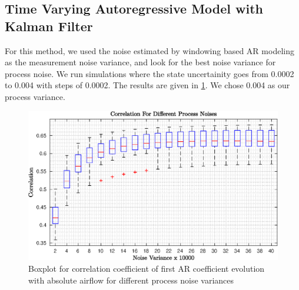 \subsection{Time Varying Autoregressive Model with Kalman Filter}
For this method, we used the noise estimated by windowing based AR modeling as the measurement noise variance, and look for the best noise variance for process noise. We run simulations where the state uncertainity goes from 0.0002 to 0.004 with steps of 0.0002. The results are given in \ref{fig:abs_airflow_kalman_noise_selection}. We chose 0.004 as our process variance.

\begin{figure}
	\begin{center}
		\includegraphics[width=\textwidth]{figures/corr_abs_for_kalman_noise_selection.eps}
		\caption{Boxplot for correlation coefficient of first AR coefficient evolution with absolute airflow for different process noise variances}
		\label{fig:abs_airflow_kalman_noise_selection}
	\end{center}
\end{figure}

